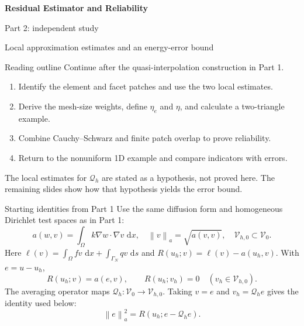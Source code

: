 \documentclass[11pt,aspectratio=169]{beamer}
\newcommand{\dd}{\,\mathrm{d}}
\newcommand{\Om}{\Omega}
\newcommand{\GamN}{\Gamma_N}
\newcommand{\Vzero}{\mathcal V_0}
\newcommand{\Vhzero}{\mathcal V_{h,0}}
\newcommand{\Qh}{\mathcal Q_h}
\newcommand{\norm}[2][]{\left\lVert#2\right\rVert_{#1}}
\newcommand{\grad}{\nabla}
\begin{document}
\begin{frame}[plain]
  \centering\vfill
  {\LARGE\bfseries Residual Estimator and Reliability\par}
  \vspace{0.45cm}
  {\large Part 2: independent study\par}
  \vspace{0.25cm}
  {\large Local approximation estimates and an energy-error bound\par}
  \vfill
\end{frame}

\begin{frame}{Reading outline}
Continue after the quasi-interpolation construction in Part 1.
\begin{enumerate}
  \item Identify the element and facet patches and use the two local estimates.
  \item Derive the mesh-size weights, define $\eta_e$ and $\eta$, and
  calculate a two-triangle example.
  \item Combine Cauchy--Schwarz and finite patch overlap to prove reliability.
  \item Return to the nonuniform 1D example and compare indicators with errors.
\end{enumerate}
The local estimates for $\Qh$ are stated as a hypothesis, not proved here.
The remaining slides show how that hypothesis yields the error bound.
\end{frame}

\begin{frame}{Starting identities from Part 1}
Use the same diffusion form and homogeneous Dirichlet test spaces as in Part 1:
\[
 a(w,v)=\int_\Om k\grad w\cdot\grad v\,\dd x,
 \quad \norm[a]{v}=\sqrt{a(v,v)},
 \quad \Vhzero\subset\Vzero.
\]
Here $\ell(v)=\int_\Om fv\,\dd x+\int_{\GamN}qv\,\dd s$ and
$R(u_h;v)=\ell(v)-a(u_h,v)$. With $e=u-u_h$,
\[
 R(u_h;v)=a(e,v),\qquad R(u_h;v_h)=0\quad(v_h\in\Vhzero).
\]
The averaging operator maps $\Qh:\Vzero\to\Vhzero$. Taking $v=e$ and
$v_h=\Qh e$ gives the identity used below:
\[
 \boxed{\norm[a]{e}^2=R(u_h;e-\Qh e).}
\]
\end{frame}
\end{document}
